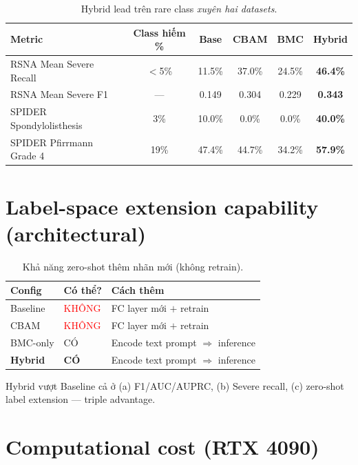 \documentclass[11pt,a4paper]{article}
\newcommand{\best}[1]{\textbf{#1}}
\begin{document}
\begin{table}[h]
\centering
\caption{Hybrid lead trên rare class \emph{xuyên hai datasets}.}
\small
\begin{tabular}{@{}lccccc@{}}
\toprule
\rowcolor{tablehdr}
Metric & Class hiếm \% & Base & CBAM & BMC & \best{Hybrid} \\
\midrule
RSNA Mean Severe Recall   & $<$5\% & 11.5\% & 37.0\% & 24.5\% & \best{46.4\%} \\
RSNA Mean Severe F1       & ---   & 0.149  & 0.304  & 0.229  & \best{0.343} \\
SPIDER Spondylolisthesis  & 3\%   & 10.0\% & 0.0\%  & 0.0\%  & \best{40.0\%} \\
SPIDER Pfirrmann Grade 4  & 19\%  & 47.4\% & 44.7\% & 34.2\% & \best{57.9\%} \\
\bottomrule
\end{tabular}
\end{table}

\section{Label-space extension capability (architectural)}

\begin{table}[h]
\centering
\caption{Khả năng zero-shot thêm nhãn mới (không retrain).}
\small
\begin{tabular}{@{}lll@{}}
\toprule
\rowcolor{tablehdr}
Config & Có thể? & Cách thêm \\
\midrule
Baseline      & \textcolor{red}{KHÔNG} & FC layer mới $+$ retrain \\
CBAM          & \textcolor{red}{KHÔNG} & FC layer mới $+$ retrain \\
BMC-only      & \textcolor{green!60!black}{CÓ}  & Encode text prompt $\Rightarrow$ inference \\
\best{Hybrid} & \textcolor{green!60!black}{\best{CÓ}} & Encode text prompt $\Rightarrow$ inference \\
\bottomrule
\end{tabular}
\end{table}

\noindent Hybrid vượt Baseline cả ở (a) F1/AUC/AUPRC, (b) Severe
recall, (c) zero-shot label extension --- triple advantage.

\section{Computational cost (RTX 4090)}
\end{document}
